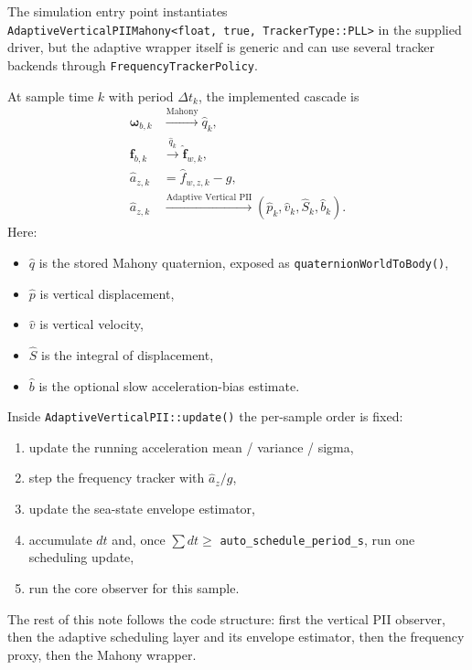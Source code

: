 \documentclass[conference]{IEEEtran}
\newcommand{\vct}[1]{\bm{#1}}
\begin{document}
    The simulation entry point instantiates
    \texttt{AdaptiveVerticalPIIMahony<float,\ true,\ TrackerType::PLL>}
    in the supplied driver, but the adaptive wrapper itself is generic and can
    use several tracker backends through \texttt{FrequencyTrackerPolicy}.

    At sample time \(k\) with period \(\Delta t_k\), the implemented cascade is
    \begin{align}
        \vct{\omega}_{b,k} &\xrightarrow{\text{Mahony}} \hat{q}_k, \\
        \vct{f}_{b,k} &\xrightarrow{\hat{q}_k} \hat{\vct{f}}_{w,k}, \\
        \hat{a}_{z,k} &= \hat{f}_{w,z,k} - g, \\
        \hat{a}_{z,k} &\xrightarrow{\text{Adaptive Vertical PII}}
        (\hat{p}_k,\hat{v}_k,\hat{S}_k,\hat{b}_k).
    \end{align}
    Here:
    \begin{itemize}[leftmargin=1.4em]
        \item \(\hat{q}\) is the stored Mahony quaternion, exposed as
        \texttt{quaternionWorldToBody()},
        \item \(\hat{p}\) is vertical displacement,
        \item \(\hat{v}\) is vertical velocity,
        \item \(\hat{S}\) is the integral of displacement,
        \item \(\hat{b}\) is the optional slow acceleration-bias estimate.
    \end{itemize}

    Inside \texttt{AdaptiveVerticalPII::update()} the per-sample order is fixed:
    \begin{enumerate}[leftmargin=1.5em]
        \item update the running acceleration mean / variance / sigma,
        \item step the frequency tracker with \(\hat{a}_z/g\),
        \item update the sea-state envelope estimator,
        \item accumulate \(dt\) and, once
        \(\sum dt \ge\) \texttt{auto\_schedule\_period\_s}, run one scheduling
        update,
        \item run the core observer for this sample.
    \end{enumerate}

    The rest of this note follows the code structure:
    first the vertical PII observer, then the adaptive scheduling layer and its
    envelope estimator, then the frequency proxy, then the Mahony wrapper.
\end{document}
